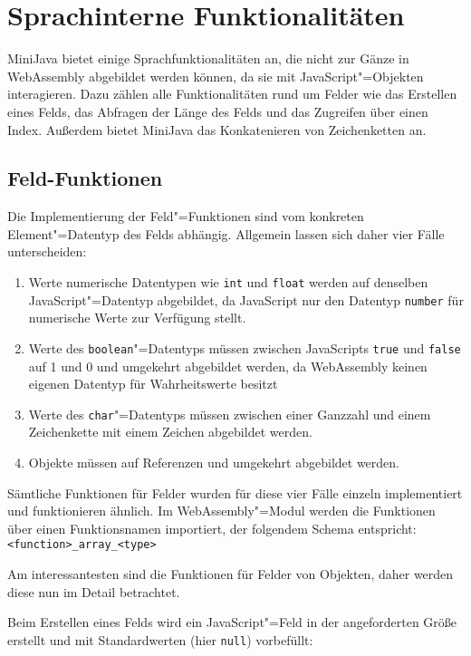 \section{Sprachinterne Funktionalitäten}
\label{sec:Sprachinterne-Funktionalitäten}

MiniJava bietet einige Sprachfunktionalitäten an, die nicht zur Gänze in WebAssembly abgebildet werden können, da sie mit JavaScript"=Objekten interagieren. Dazu zählen alle Funktionalitäten rund um Felder wie das Erstellen eines Felds, das Abfragen der Länge des Felds und das Zugreifen über einen Index. Außerdem bietet MiniJava das Konkatenieren von Zeichenketten an.

\subsection{Feld-Funktionen}
\label{subsec:Feld-Funktionen}

Die Implementierung der Feld"=Funktionen sind vom konkreten Element"=Datentyp des Felds abhängig. Allgemein lassen sich daher vier Fälle unterscheiden:

\begin{enumerate}
    \item Werte numerische Datentypen wie \lstinline{int} und \lstinline{float} werden auf denselben JavaScript"=Datentyp abgebildet, da JavaScript nur den Datentyp \lstinline{number} für numerische Werte zur Verfügung stellt.
    \item Werte des \lstinline{boolean}"=Datentyps müssen zwischen JavaScripts \lstinline{true} und \lstinline{false} auf 1 und 0 und umgekehrt abgebildet werden, da WebAssembly keinen eigenen Datentyp für Wahrheitswerte besitzt
    \item Werte des \lstinline{char}"=Datentyps müssen zwischen einer Ganzzahl und einem Zeichenkette mit einem Zeichen abgebildet werden.
    \item Objekte  müssen auf Referenzen und umgekehrt abgebildet werden. 
\end{enumerate}

Sämtliche Funktionen für Felder wurden für diese vier Fälle einzeln implementiert und funktionieren ähnlich. Im WebAssembly"=Modul werden die Funktionen über einen Funktionsnamen importiert, der folgendem Schema entspricht: \lstinline{<function>_array_<type>}

Am interessantesten sind die Funktionen für Felder von Objekten, daher werden diese nun im Detail betrachtet.

Beim Erstellen eines Felds wird ein JavaScript"=Feld in der angeforderten Größe erstellt und mit Standardwerten (hier \lstinline{null}) vorbefüllt:



